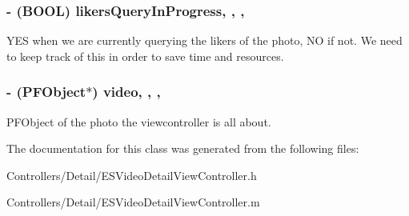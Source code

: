 \subsubsection[{likers\+Query\+In\+Progress}]{\setlength{\rightskip}{0pt plus 5cm}-\/ (B\+O\+O\+L) likers\+Query\+In\+Progress\hspace{0.3cm}{\ttfamily [read]}, {\ttfamily [write]}, {\ttfamily [nonatomic]}, {\ttfamily [assign]}}\label{interface_e_s_video_detail_view_controller_a042ded94d23d82fd4e732c607c308d95}
Y\+E\+S when we are currently querying the likers of the photo, N\+O if not. We need to keep track of this in order to save time and resources. \hypertarget{interface_e_s_video_detail_view_controller_a932d0b5ee570f18801ca0b9e324b23fe}{}
\subsubsection[{video}]{\setlength{\rightskip}{0pt plus 5cm}-\/ (P\+F\+Object$\ast$) video\hspace{0.3cm}{\ttfamily [read]}, {\ttfamily [write]}, {\ttfamily [nonatomic]}, {\ttfamily [strong]}}\label{interface_e_s_video_detail_view_controller_a932d0b5ee570f18801ca0b9e324b23fe}
P\+F\+Object of the photo the viewcontroller is all about. 

The documentation for this class was generated from the following files\+:\begin{DoxyCompactItemize}
\item 
Controllers/\+Detail/E\+S\+Video\+Detail\+View\+Controller.\+h\item 
Controllers/\+Detail/E\+S\+Video\+Detail\+View\+Controller.\+m\end{DoxyCompactItemize}

